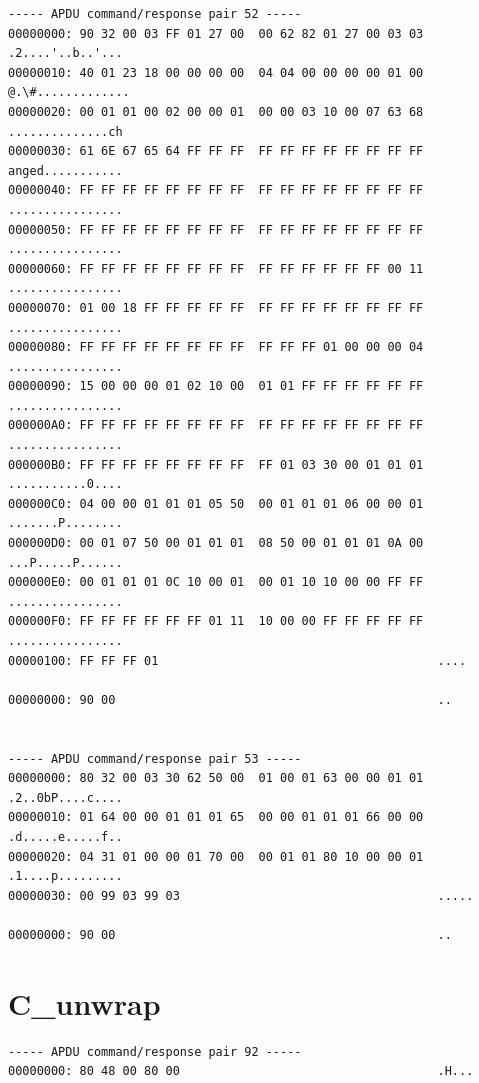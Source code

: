 \documentclass[bsc,frontabs,twoside,singlespacing,parskip,deptreport]{infthesis}     %
\begin{document}
\begin{appendices}
\begin{Verbatim}[commandchars=\\\{\}, fontsize=\small]
----- APDU command/response pair 52 -----
00000000: 90 32 00 03 FF 01 27 00  00 62 82 01 27 00 03 03  .2....'..b..'...
00000010: 40 01 23 18 00 00 00 00  04 04 00 00 00 00 01 00  @.\#.............
00000020: 00 01 01 00 02 00 00 01  00 00 03 10 00 07 63 68  ..............ch
00000030: 61 6E 67 65 64 FF FF FF  FF FF FF FF FF FF FF FF  anged...........
00000040: FF FF FF FF FF FF FF FF  FF FF FF FF FF FF FF FF  ................
00000050: FF FF FF FF FF FF FF FF  FF FF FF FF FF FF FF FF  ................
00000060: FF FF FF FF FF FF FF FF  FF FF FF FF FF FF 00 11  ................
00000070: 01 00 18 FF FF FF FF FF  FF FF FF FF FF FF FF FF  ................
00000080: FF FF FF FF FF FF FF FF  FF FF FF 01 00 00 00 04  ................
00000090: 15 00 00 00 01 02 10 00  01 01 FF FF FF FF FF FF  ................
000000A0: FF FF FF FF FF FF FF FF  FF FF FF FF FF FF FF FF  ................
000000B0: FF FF FF FF FF FF FF FF  FF 01 03 30 00 01 01 01  ...........0....
000000C0: 04 00 00 01 01 01 05 50  00 01 01 01 06 00 00 01  .......P........
000000D0: 00 01 07 50 00 01 01 01  08 50 00 01 01 01 0A 00  ...P.....P......
000000E0: 00 01 01 01 0C 10 00 01  00 01 10 10 00 00 FF FF  ................
000000F0: FF FF FF FF FF FF 01 11  10 00 00 FF FF FF FF FF  ................
00000100: FF FF FF 01                                       ....

00000000: 90 00                                             ..


----- APDU command/response pair 53 -----
00000000: 80 32 00 03 30 62 50 00  01 00 01 63 00 00 01 01  .2..0bP....c....
00000010: 01 64 00 00 01 01 01 65  00 00 01 01 01 66 00 00  .d.....e.....f..
00000020: 04 31 01 00 00 01 70 00  00 01 01 80 10 00 00 01  .1....p.........
00000030: 00 99 03 99 03                                    .....

00000000: 90 00                                             ..

\end{Verbatim}

\section{C\_unwrap}
\begin{Verbatim}[commandchars=\\\{\}, fontsize=\small]
----- APDU command/response pair 92 -----
00000000: 80 48 00 80 00                                    .H...


\end{Verbatim}
\end{appendices}
\end{document}
